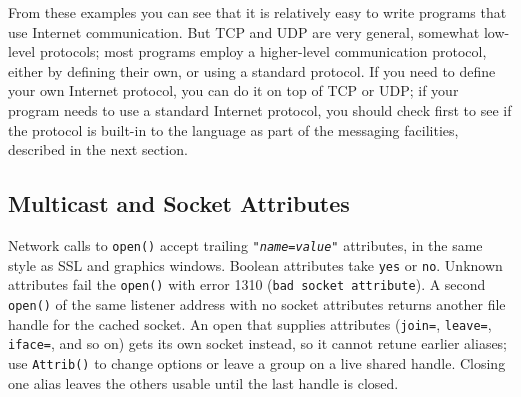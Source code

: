 
From these examples you can see that it is relatively easy to write
programs that use Internet communication. But TCP and UDP are very
general, somewhat low-level protocols; most programs employ a
higher-level communication protocol, either by defining their own, or
using a standard protocol. If you need to define your own Internet
protocol, you can do it on top of TCP or UDP; if your program needs to
use a standard Internet protocol, you should check first to see if the
protocol is built-in to the language as part of the messaging
facilities, described in the next section.

\subsection*{Multicast and Socket Attributes}
Network calls to \texttt{open()} accept trailing
\texttt{"\textit{name}=\textit{value}"} attributes, in the same style as
SSL and graphics windows. Boolean attributes take \texttt{yes} or
\texttt{no}. Unknown attributes fail the \texttt{open()} with error
1310 (\texttt{bad socket attribute}).
A second \texttt{open()} of the same listener address with no socket
attributes returns another file handle for the cached socket. An open
that supplies attributes (\texttt{join=}, \texttt{leave=},
\texttt{iface=}, and so on) gets its own socket instead, so it cannot
retune earlier aliases; use \texttt{Attrib()} to change options or leave
a group on a live shared handle. Closing one alias leaves the others
usable until the last handle is closed.

